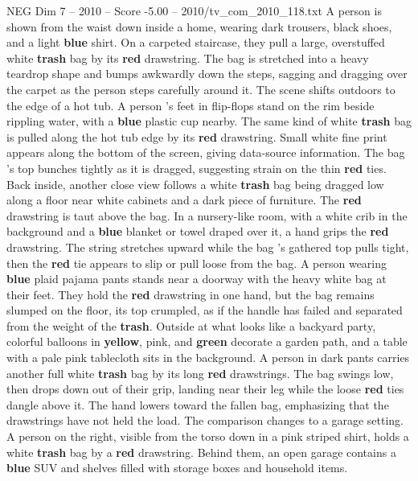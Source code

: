 \begin{textsample}{NEG Dim 7 – 2010 – Score -5.00 – 2010/tv\_com\_2010\_118.txt}  \label{ex:f7_neg_043}
A person is shown from the waist down inside a home, wearing dark trousers, black shoes, and a light \textbf{blue} shirt.
On a carpeted staircase, they pull a large, overstuffed white \textbf{trash} bag by its \textbf{red} drawstring.
The bag is stretched into a heavy teardrop shape and bumps awkwardly down the steps, sagging and dragging over the carpet as the person steps carefully around it.
The scene shifts outdoors to the edge of a hot tub.
A person ’s feet in flip-flops stand on the rim beside rippling water, with a \textbf{blue} plastic cup nearby.
The same kind of white \textbf{trash} bag is pulled along the hot tub edge by its \textbf{red} drawstring.
Small white fine print appears along the bottom of the screen, giving data-source information.
The bag ’s top bunches tightly as it is dragged, suggesting strain on the thin \textbf{red} ties.
Back inside, another close view follows a white \textbf{trash} bag being dragged low along a floor near white cabinets and a dark piece of furniture.
The \textbf{red} drawstring is taut above the bag.
In a nursery-like room, with a white crib in the background and a \textbf{blue} blanket or towel draped over it, a hand grips the \textbf{red} drawstring.
The string stretches upward while the bag ’s gathered top pulls tight, then the \textbf{red} tie appears to slip or pull loose from the bag.
A person wearing \textbf{blue} plaid pajama pants stands near a doorway with the heavy white bag at their feet.
They hold the \textbf{red} drawstring in one hand, but the bag remains slumped on the floor, its top crumpled, as if the handle has failed and separated from the weight of the \textbf{trash}.
Outside at what looks like a backyard party, colorful balloons in \textbf{yellow}, pink, and \textbf{green} decorate a garden path, and a table with a pale pink tablecloth sits in the background.
A person in dark pants carries another full white \textbf{trash} bag by its long \textbf{red} drawstrings.
The bag swings low, then drops down out of their grip, landing near their leg while the loose \textbf{red} ties dangle above it.
The hand lowers toward the fallen bag, emphasizing that the drawstrings have not held the load.
The comparison changes to a garage setting.
A person on the right, visible from the torso down in a pink striped shirt, holds a white \textbf{trash} bag by a \textbf{red} drawstring.
Behind them, an open garage contains a \textbf{blue} SUV and shelves filled with storage boxes and household items.

\end{textsample}
